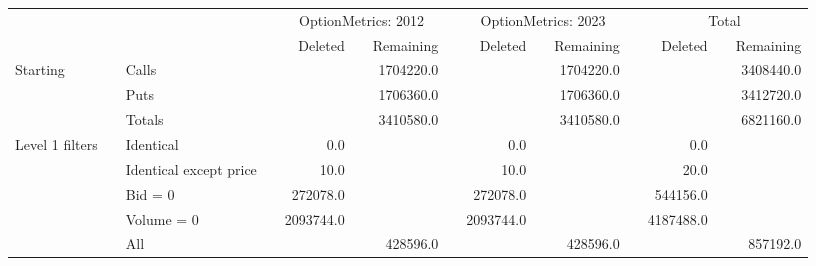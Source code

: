 

    \begin{tabular}{*{4}{l} *{11}{r} }
       
        
         \multicolumn{4}{c}{}  & \multicolumn{3}{c}{OptionMetrics: 2012}  &  \multicolumn{1}{c}{} & 
         \multicolumn{3}{c}{OptionMetrics: 2023}&  \multicolumn{1}{c}{}  &
          \multicolumn{3}{c}{Total}  \\
         \cline{5-7}
                  
         \cline{9-11}
         \cline{13-15}
         
          &  & & & 
          Deleted &  & Remaining & &
          Deleted &  & Remaining & &
          Deleted &  & Remaining 
          \\

       \hline

	
				Starting & & Calls & &
				 & & 1704220.0 & &
				 & & 1704220.0 & &
				 & & 3408440.0 \\
			
				  & & Puts & &
				 & & 1706360.0 & &
				 & & 1706360.0 & &
				 & & 3412720.0 \\
			
				  & & Totals & &
				 & & 3410580.0 & &
				 & & 3410580.0 & &
				 & & 6821160.0 \\
			
				Level 1 filters & & Identical & &
				0.0 & &  & &
				0.0 & &  & &
				0.0 & &  \\
			
				  & & Identical except price & &
				10.0 & &  & &
				10.0 & &  & &
				20.0 & &  \\
			
				  & & Bid = 0 & &
				272078.0 & &  & &
				272078.0 & &  & &
				544156.0 & &  \\
			
				  & & Volume = 0 & &
				2093744.0 & &  & &
				2093744.0 & &  & &
				4187488.0 & &  \\
			
				  & & All & &
				 & & 428596.0 & &
				 & & 428596.0 & &
				 & & 857192.0 \\
			

	        \hline
	    \end{tabular}
	
